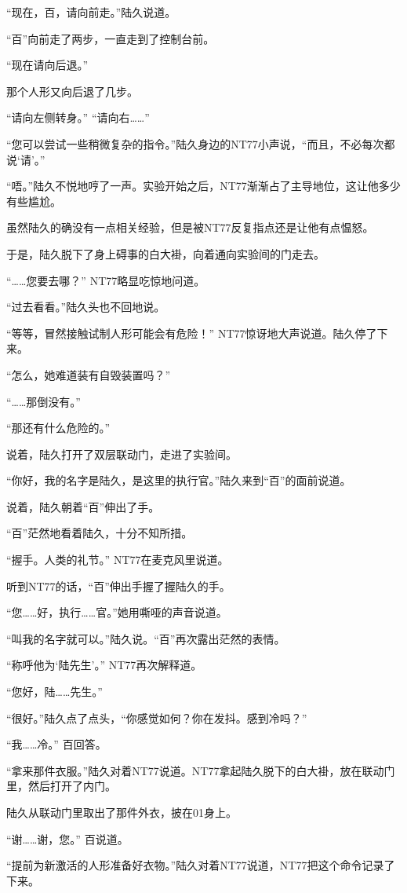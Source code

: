 “现在，百，请向前走。”陆久说道。

“百”向前走了两步，一直走到了控制台前。

“现在请向后退。”

那个人形又向后退了几步。

“请向左侧转身。” “请向右……”

“您可以尝试一些稍微复杂的指令。”陆久身边的NT77小声说，“而且，不必每次都说‘请’。”

“唔。”陆久不悦地哼了一声。实验开始之后，NT77渐渐占了主导地位，这让他多少有些尴尬。

虽然陆久的确没有一点相关经验，但是被NT77反复指点还是让他有点愠怒。

于是，陆久脱下了身上碍事的白大褂，向着通向实验间的门走去。

“……您要去哪？” NT77略显吃惊地问道。

“过去看看。”陆久头也不回地说。

“等等，冒然接触试制人形可能会有危险！” NT77惊讶地大声说道。陆久停了下来。

“怎么，她难道装有自毁装置吗？”

“……那倒没有。”

“那还有什么危险的。”

说着，陆久打开了双层联动门，走进了实验间。

“你好，我的名字是陆久，是这里的执行官。”陆久来到“百”的面前说道。

说着，陆久朝着“百”伸出了手。

“百”茫然地看着陆久，十分不知所措。

“握手。人类的礼节。” NT77在麦克风里说道。

听到NT77的话，“百”伸出手握了握陆久的手。

“您……好，执行……官。”她用嘶哑的声音说道。

“叫我的名字就可以。”陆久说。“百”再次露出茫然的表情。

“称呼他为‘陆先生’。” NT77再次解释道。

“您好，陆……先生。”

“很好。”陆久点了点头，“你感觉如何？你在发抖。感到冷吗？”

“我……冷。” 百回答。

“拿来那件衣服。”陆久对着NT77说道。NT77拿起陆久脱下的白大褂，放在联动门里，然后打开了内门。

陆久从联动门里取出了那件外衣，披在01身上。

“谢……谢，您。” 百说道。

“提前为新激活的人形准备好衣物。”陆久对着NT77说道，NT77把这个命令记录了下来。

